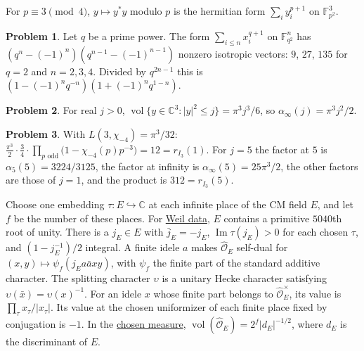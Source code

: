 \documentclass[reqno]{amsart}
\theoremstyle{definition}
\newtheorem{problem}{Problem}[section]
\theoremstyle{plain}
\theoremstyle{remark}
\newcommand{\C}{\mathbb{C}}
\newcommand{\Oh}{\hat{\mathcal O}_E}
\newcommand{\vol}{\operatorname{vol}}
\newcommand{\glsrc}[3]{\href{https://github.com/lsernau/grh-lean/blob/72fead1/grh/src/#1\#L#2}{#3}}
\begin{document}
For \(p\equiv3\pmod4\), \(y\mapsto y^*y\) modulo \(p\) is the hermitian form \(\sum_iy_i^{p+1}\) on \(\mathbb F_{p^2}^3\).

\begin{problem}\label{pr:isotropic}
Let \(q\) be a prime power.  The form \(\sum_{i\le n}x_i^{q+1}\) on \(\mathbb F_{q^2}^n\) has \((q^n-(-1)^n)(q^{n-1}-(-1)^{n-1})\) nonzero isotropic vectors: \(9\), \(27\), \(135\) for \(q=2\) and \(n=2,3,4\).  Divided by \(q^{2n-1}\) this is \((1-(-1)^nq^{-n})(1+(-1)^nq^{1-n})\).
\end{problem}

\begin{problem}\label{pr:real-density}
For real \(j>0\), \(\vol\{y\in\C^3:\lvert y\rvert^2\le j\}=\pi^3j^3/6\), so \(\alpha_\infty(j)=\pi^3j^2/2\).
\end{problem}

\begin{problem}\label{pr:densities}
With \(L(3,\chi_{-4})=\pi^3/32\): \(\frac{\pi^3}2\cdot\frac34\cdot\prod_{p\text{ odd}}\bigl(1-\chi_{-4}(p)p^{-3}\bigr)=12=r_{I_3}(1)\).  For \(j=5\) the factor at \(5\) is \(\alpha_5(5)=3224/3125\), the factor at infinity is \(\alpha_\infty(5)=25\pi^3/2\), the other factors are those of \(j=1\), and the product is \(312=r_{I_3}(5)\).
\end{problem}

Choose one embedding \(\tau\colon E\hookrightarrow\C\) at each infinite place of the CM field \(E\), and let \(f\) be the number of these places.  For \glsrc{Lib/Weil/Construction/WeilData.lean}{73}{Weil data}, \(E\) contains a primitive \(5040\)th root of unity.  There is a \(j_E\in E\) with \(\bar j_E=-j_E\), \(\operatorname{Im}\tau(j_E)>0\) for each chosen \(\tau\), and \((1-j_E^{-1})/2\) integral.  A finite idele \(a\) makes \(\Oh\) self-dual for \((x,y)\mapsto\psi_f(j_E a\bar a xy)\), with \(\psi_f\) the finite part of the standard additive character.  The splitting character \(\upsilon\) is a unitary Hecke character satisfying \(\upsilon(\bar x)=\upsilon(x)^{-1}\).  For an idele \(x\) whose finite part belongs to \(\Oh^\times\), its value is \(\prod_\tau x_\tau/\lvert x_\tau\rvert\).  Its value at the chosen uniformizer of each finite place fixed by conjugation is \(-1\).  In the \glsrc{Lib/Adelic/Adeles/AdditiveCharacter.lean}{128}{chosen measure}, \(\vol(\Oh)=2^f\lvert d_E\rvert^{-1/2}\), where \(d_E\) is the discriminant of \(E\).
\end{document}
